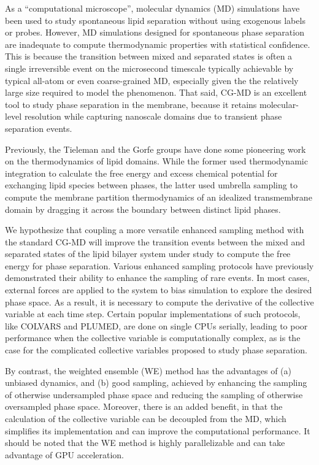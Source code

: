 \documentclass{biophys-new}
\begin{document}
As a ``computational microscope\cite{Dror2012}'', molecular dynamics (MD) simulations have been used to study spontaneous lipid separation without using exogenous labels or probes\cite{Pantelopulos2018}.
However, MD simulations designed for spontaneous phase separation are inadequate to compute thermodynamic properties with statistical confidence.
This is because the transition between mixed and separated states is often a single irreversible event on the microsecond timescale typically achievable by typical all-atom or even coarse-grained MD\cite{Risselada2008,Bennett2018}, especially given the
the relatively large size required to model the phenomenon.
That said, CG-MD is an excellent tool to study phase separation in the membrane, because it retains molecular-level resolution while capturing nanoscale domains due to transient phase separation events.

Previously, the Tieleman\cite{Bennett2018} and the Gorfe groups\cite{Lin2019} have done some pioneering work on the thermodynamics of lipid domains.
While the former used thermodynamic integration\cite{Salsburg1953} to calculate the free energy and excess chemical potential for exchanging lipid species between phases, the latter used umbrella sampling\cite{TorrieG.MValleau1977} to compute the membrane partition thermodynamics of an idealized transmembrane domain by dragging it across the boundary between distinct lipid phases.

We hypothesize that coupling a more versatile enhanced sampling method with the standard CG-MD will improve the transition events between the mixed and separated states of the lipid bilayer system under study to compute the free energy for phase separation.
Various enhanced sampling protocols have previously demonstrated their ability to enhance the sampling of rare events\cite{Henin2022}.
In most cases, external forces are applied to the system to bias simulation to explore the desired phase space.
As a result, it is necessary to compute the derivative of the collective variable at each time step.
Certain popular implementations of such protocols, like COLVARS\cite{Fiorin2013} and PLUMED\cite{Barducci2015}, are done on single CPUs serially, leading to poor performance when the collective variable is computationally complex, as is the case for the complicated collective variables proposed to study phase separation.

By contrast, the weighted ensemble (WE)\cite{Huber1996, Zuckerman2017} method has the advantages of (a) unbiased dynamics, and (b) good sampling, achieved by enhancing the sampling of otherwise undersampled phase space and reducing the sampling of otherwise oversampled phase space.
Moreover, there is an added benefit, in that the calculation of the collective variable can be decoupled from the MD, which simplifies its implementation and can improve the computational performance.
It should be noted that the WE method is highly parallelizable and can take advantage of GPU acceleration\cite{Zwier2015}.
\end{document}
